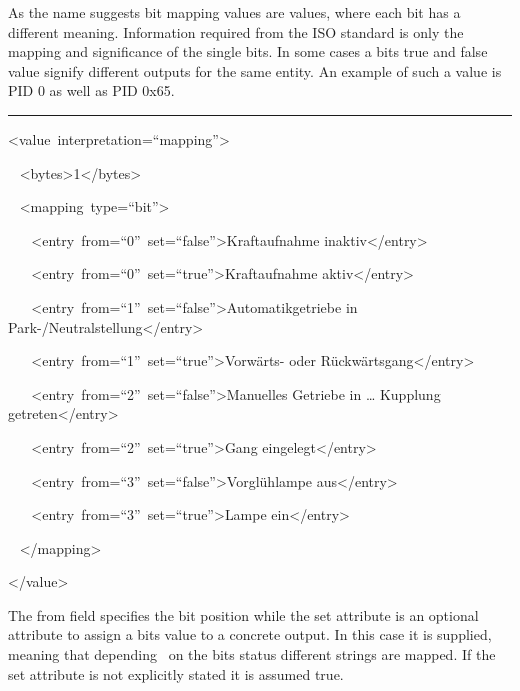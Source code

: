 {As the name suggests bit mapping values are values, where each bit has
a different meaning. Information required from the ISO standard is only
the mapping and significance of the single bits. In some cases a bits
true and false value signify different outputs for the same entity. An
example of such a value is PID 0 as well as PID 0x65.}

\begin{center}\rule{0.5\linewidth}{\linethickness}\end{center}

{}

{\textless{}value}{~}{interpretation}{=}{``mapping''\textgreater{}}

{~ }{\textless{}bytes\textgreater{}}{1}{\textless{}/bytes\textgreater{}}

{~ }{\textless{}mapping}{~}{type}{=}{``bit''\textgreater{}}

{~ ~
}{\textless{}entry}{~}{from}{=}{``0''}{~}{set}{=}{``false''}{\textgreater{}}{Kraftaufnahme
inaktiv}{\textless{}/entry\textgreater{}}

{~ ~
}{\textless{}entry}{~}{from}{=}{``0''}{~}{set}{=}{``true''}{\textgreater{}}{Kraftaufnahme
aktiv}{\textless{}/entry\textgreater{}}

{~ ~
}{\textless{}entry}{~}{from}{=}{``1''}{~}{set}{=}{``false''}{\textgreater{}}{Automatikgetriebe
in Park-/Neutralstellung}{\textless{}/entry\textgreater{}}

{~ ~
}{\textless{}entry}{~}{from}{=}{``1''}{~}{set}{=}{``true''}{\textgreater{}}{Vorwärts-
oder Rückwärtsgang}{\textless{}/entry\textgreater{}}

{~ ~
}{\textless{}entry}{~}{from}{=}{``2''}{~}{set}{=}{``false''}{\textgreater{}}{Manuelles
Getriebe in \ldots{} Kupplung getreten}{\textless{}/entry\textgreater{}}

{~ ~
}{\textless{}entry}{~}{from}{=}{``2''}{~}{set}{=}{``true''}{\textgreater{}}{Gang
eingelegt}{\textless{}/entry\textgreater{}}

{~ ~
}{\textless{}entry}{~}{from}{=}{``3''}{~}{set}{=}{``false''}{\textgreater{}}{Vorglühlampe
aus}{\textless{}/entry\textgreater{}}

{~ ~
}{\textless{}entry}{~}{from}{=}{``3''}{~}{set}{=}{``true''}{\textgreater{}}{Lampe
ein}{\textless{}/entry\textgreater{}}

{~ }{\textless{}/mapping\textgreater{}}

{\textless{}/value\textgreater{}}

{The from field specifies the bit position while the set attribute is an
optional attribute to assign a bits value to a concrete output. In this
case it is supplied, meaning that depending ~on the bits status
different strings are mapped. If the set attribute is not explicitly
stated it is assumed true.}

